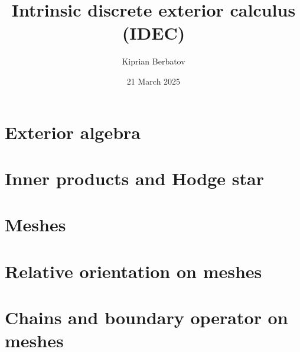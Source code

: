 \documentclass{article}
\title{Intrinsic discrete exterior calculus (IDEC)}
\author{Kiprian Berbatov}
\date{21 March 2025}
\theoremstyle{definition}
\begin{document}

\maketitle

\tableofcontents
\NewCommandCopy\oricontentsline\contentsline
\makeatletter
\RenewDocumentCommand{}
{%
  {\let\numberline\@gobble
    }%
}
\makeatother

\listoffigures

\listoftables


\section{Exterior algebra}
\label{section:exterior_algebra}


\section{Inner products and Hodge star}
\label{section:inner_products_and_hodge_star}


\section{Meshes}
\label{section:meshes}


\section{Relative orientation on meshes}
\label{section:relative_orientation_on_meshes}





\section{Chains and boundary operator on meshes}
\label{section:chains_and_boundary_operator_on_meshes}







\end{document}
